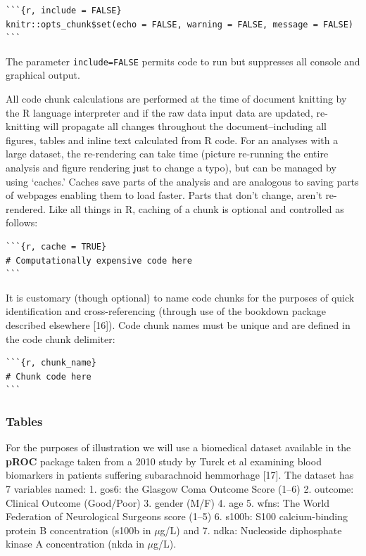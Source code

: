 \documentclass[]{elsarticle} %
\begin{document}
\begin{verbatim}
```{r, include = FALSE}
knitr::opts_chunk$set(echo = FALSE, warning = FALSE, message = FALSE)
```
\end{verbatim}

\noindent The parameter \texttt{include=FALSE} permits code to run but
suppresses all console and graphical output.

All code chunk calculations are performed at the time of document
knitting by the R language interpreter and if the raw data input data
are updated, re-knitting will propagate all changes throughout the
document--including all figures, tables and inline text calculated from
R code. For an analyses with a large dataset, the re-rendering can take
time (picture re-running the entire analysis and figure rendering just
to change a typo), but can be managed by using `caches.' Caches save
parts of the analysis and are analogous to saving parts of webpages
enabling them to load faster. Parts that don't change, aren't
re-rendered. Like all things in R, caching of a chunk is optional and
controlled as follows:

\begin{verbatim}
```{r, cache = TRUE} 
# Computationally expensive code here
```
\end{verbatim}

It is customary (though optional) to name code chunks for the purposes
of quick identification and cross-referencing (through use of the
bookdown package described elsewhere {[}16{]}). Code chunk names must be
unique and are defined in the code chunk delimiter:

\begin{verbatim}
```{r, chunk_name} 
# Chunk code here
```
\end{verbatim}

\hypertarget{tables}{%
\subsubsection{Tables}\label{tables}}

For the purposes of illustration we will use a biomedical dataset
available in the \textbf{pROC} package taken from a 2010 study by Turck
et al examining blood biomarkers in patients suffering subarachnoid
hemmorhage {[}17{]}. The dataset has 7 variables named: 1. gos6: the
Glasgow Coma Outcome Score (1--6) 2. outcome: Clinical Outcome
(Good/Poor) 3. gender (M/F) 4. age 5. wfns: The World Federation of
Neurological Surgeons score (1--5) 6. s100b: S100 calcium-binding
protein B concentration (s100b in \(\mu\)g/L) and 7. ndka: Nucleoside
diphosphate kinase A concentration (nkda in \(\mu\)g/L).
\end{document}
